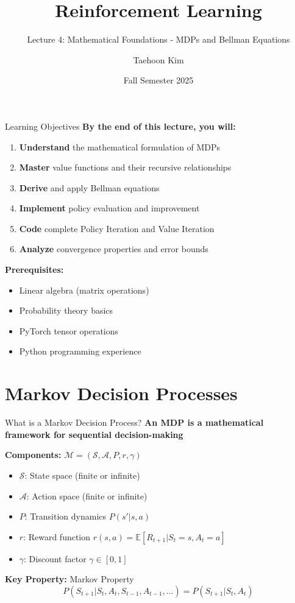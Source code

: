 \documentclass[aspectratio=169,10pt]{beamer}
\title{Reinforcement Learning}
\subtitle{Lecture 4: Mathematical Foundations - MDPs and Bellman Equations}
\author{Taehoon Kim}
\institute{Sogang University MIMIC Lab \\ \url{https://mimic-lab.com}}
\date{Fall Semester 2025}
\begin{document}
\frame{\titlepage}


\begin{frame}{Learning Objectives}
\textbf{By the end of this lecture, you will:}
\begin{enumerate}
    \item \textbf{Understand} the mathematical formulation of MDPs
    \item \textbf{Master} value functions and their recursive relationships
    \item \textbf{Derive} and apply Bellman equations
    \item \textbf{Implement} policy evaluation and improvement
    \item \textbf{Code} complete Policy Iteration and Value Iteration
    \item \textbf{Analyze} convergence properties and error bounds
\end{enumerate}

\vspace{0.5cm}
\textbf{Prerequisites:}
\begin{itemize}
    \item Linear algebra (matrix operations)
    \item Probability theory basics
    \item PyTorch tensor operations
    \item Python programming experience
\end{itemize}
\end{frame}

\section{Markov Decision Processes}

\begin{frame}{What is a Markov Decision Process?}
\textbf{An MDP is a mathematical framework for sequential decision-making}

\vspace{0.5cm}
\textbf{Components:} $\mathcal{M} = (\mathcal{S}, \mathcal{A}, P, r, \gamma)$
\begin{itemize}
    \item $\mathcal{S}$: State space (finite or infinite)
    \item $\mathcal{A}$: Action space (finite or infinite)
    \item $P$: Transition dynamics $P(s' | s, a)$
    \item $r$: Reward function $r(s, a) = \mathbb{E}[R_{t+1} | S_t=s, A_t=a]$
    \item $\gamma$: Discount factor $\gamma \in [0, 1]$
\end{itemize}

\vspace{0.5cm}
\textbf{Key Property:} Markov Property
\begin{equation}
P(S_{t+1} | S_t, A_t, S_{t-1}, A_{t-1}, ...) = P(S_{t+1} | S_t, A_t)
\end{equation}
\end{frame}
\end{document}
